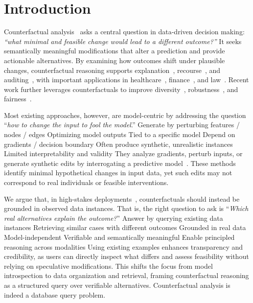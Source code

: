 \section{Introduction}
Counterfactual analysis~\cite{wachter2017counterfactual,mothilal2020explaining} asks a central question in data-driven decision making: \textit{``what minimal and feasible change would lead to a different outcome?''} It seeks semantically meaningful modifications that alter a prediction and provide actionable alternatives. By examining how outcomes shift under plausible changes, counterfactual reasoning supports explanation~\cite{dandl2020multi}, recourse~\cite{karimi2021algorithmic}, and auditing~\cite{lee2021auditing}, with important applications in healthcare~\cite{abrate2021counterfactual}, finance~\cite{yang2021exploring}, and law~\cite{zhang2023cfgl}. Recent work further leverages counterfactuals to improve diversity~\cite{mothilal2020explaining}, robustness~\cite{dominguez2022adversarial}, and fairness~\cite{von2022fairness}.

Most existing approaches, however, are model-centric by addressing the question ``\emph{how to change the input to fool the model}.'' Generate by perturbing features / nodes / edges
Optimizing model outputs
Tied to a specific model
Depend on gradients / decision boundary
Often produce synthetic, unrealistic instances
Limited interpretability and validity
They analyze gradients, perturb inputs, or generate synthetic edits by interrogating a predictive model~\cite{bjoru2026framework,mothilal2020explaining,dandl2020multi,pawelczyk2020learning,kanamori2020dace,lucic2021focus,vanlooveren2020interpretable,galhotra2021explaining,schleich2021geco,kavouras2023fairness}. These methods identify minimal hypothetical changes in input data, yet such edits may not correspond to real individuals or feasible interventions. 

We argue that, in high-stakes deployments~\cite{abrate2021counterfactual,yang2021exploring,lee2021auditing}, counterfactuals should instead be grounded in observed data instances. That is, the right question to ask is ``\emph{Which real alternatives explain the outcome?}'' Answer by querying existing data instances
Retrieving similar cases with different outcomes
Grounded in real data
Model-independent
Verifiable and semantically meaningful
Enable principled reasoning across modalities
Using existing examples enhances transparency and credibility, as users can directly inspect what differs and assess feasibility without relying on speculative modifications. This shifts the focus from model introspection to data organization and retrieval, framing counterfactual reasoning as a structured query over verifiable alternatives. Counterfactual analysis is indeed a database query problem.

